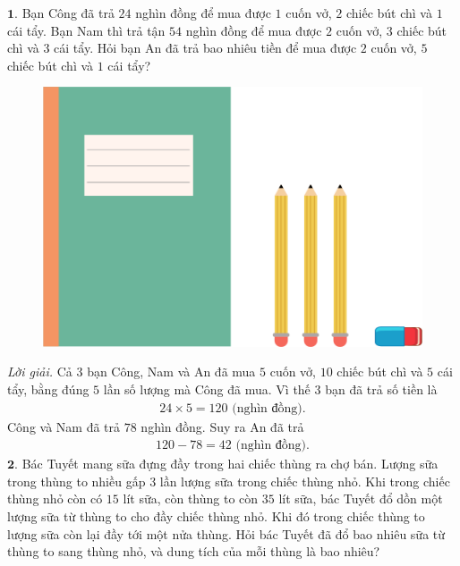 \begin{multicols}{2}
	$\pmb{1.}$	Bạn Công đã trả $24$ nghìn đồng để mua được $1$ cuốn vở, $2$ chiếc bút chì và $1$ cái tẩy. Bạn Nam thì trả tận $54$ nghìn đồng để mua được $2$ cuốn vở, $3$ chiếc bút chì và $3$ cái tẩy. Hỏi bạn An đã trả bao nhiêu tiền để mua được $2$ cuốn vở, $5$ chiếc bút chì và $1$ cái tẩy?
	\begin{figure}[H]
		\centering
		\vspace*{-5pt}
		\captionsetup{labelformat= empty, justification=centering}
		\includegraphics[width=1\linewidth]{Pi3_bai1}
		\vspace*{-10pt}
	\end{figure}
	\textit{Lời giải.} 	Cả $3$ bạn Công, Nam và An đã mua $5$ cuốn vở, $10$ chiếc bút chì và $5$ cái tẩy, bằng đúng $5$ lần số lượng mà Công đã mua. Vì thế $3$ bạn đã trả số tiền là 
	\begin{align*}
		24\times 5=120 \text{ (nghìn đồng).} 
	\end{align*}
	Công và Nam đã trả $78$ nghìn đồng. Suy ra An đã trả 
	\begin{align*}
		120-78 = 42 \text{ (nghìn đồng).}	
	\end{align*}
	 $\pmb{2.}$ Bác Tuyết mang sữa đựng đầy trong hai chiếc thùng ra chợ bán. Lượng sữa trong thùng to nhiều gấp $3$ lần lượng sữa trong chiếc thùng nhỏ. Khi trong chiếc thùng nhỏ còn có $15$ lít sữa, còn thùng to còn $35$ lít sữa, bác Tuyết đổ dồn một lượng sữa từ thùng to cho đầy chiếc thùng nhỏ. Khi đó trong chiếc thùng to lượng sữa còn lại  đầy tới một nửa thùng. Hỏi bác Tuyết đã đổ bao nhiêu sữa từ thùng to sang thùng nhỏ, và dung tích của mỗi thùng là bao nhiêu?
	 \begin{figure}[H]

\end{figure}
\end{multicols}
